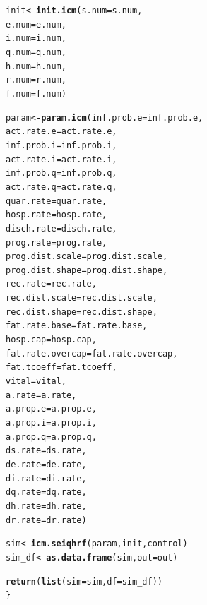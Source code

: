 \documentclass{article}\usepackage[]{graphicx}\usepackage[]{color}
\makeatletter
\newcommand{\hlstd}[1]{\textcolor[rgb]{0.345,0.345,0.345}{#1}}%
\newcommand{\hlkwb}[1]{\textcolor[rgb]{0.69,0.353,0.396}{#1}}%
\newcommand{\hlkwc}[1]{\textcolor[rgb]{0.333,0.667,0.333}{#1}}%
\newcommand{\hlkwd}[1]{\textcolor[rgb]{0.737,0.353,0.396}{\textbf{#1}}}%
\newenvironment{kframe}{%
 \def\at@end@of@kframe{}%
 \ifinner\ifhmode%
  \def\at@end@of@kframe{\end{minipage}}%
  \begin{minipage}{\columnwidth}%
 \fi\fi%
 \def\FrameCommand##1{\hskip\@totalleftmargin \hskip-\fboxsep
 \colorbox{shadecolor}{##1}\hskip-\fboxsep
     \hskip-\linewidth \hskip-\@totalleftmargin \hskip\columnwidth}%
 \MakeFramed {\advance\hsize-\width
   \@totalleftmargin\z@ \linewidth\hsize
   \@setminipage}}%
 {\par\unskip\endMakeFramed%
 \at@end@of@kframe}
\newenvironment{knitrout}{}{} %
\makeatother
\begin{document}
\begin{knitrout}
\begin{kframe}
\begin{alltt}
  \hlstd{init} \hlkwb{<-} \hlkwd{init.icm}\hlstd{(}\hlkwc{s.num} \hlstd{= s.num,}
                   \hlkwc{e.num} \hlstd{= e.num,}
                   \hlkwc{i.num} \hlstd{= i.num,}
                   \hlkwc{q.num} \hlstd{= q.num,}
                   \hlkwc{h.num} \hlstd{= h.num,}
                   \hlkwc{r.num} \hlstd{= r.num,}
                   \hlkwc{f.num} \hlstd{= f.num)}

  \hlstd{param} \hlkwb{<-}  \hlkwd{param.icm}\hlstd{(}\hlkwc{inf.prob.e} \hlstd{= inf.prob.e,}
                      \hlkwc{act.rate.e} \hlstd{= act.rate.e,}
                      \hlkwc{inf.prob.i} \hlstd{= inf.prob.i,}
                      \hlkwc{act.rate.i} \hlstd{= act.rate.i,}
                      \hlkwc{inf.prob.q} \hlstd{= inf.prob.q,}
                      \hlkwc{act.rate.q} \hlstd{= act.rate.q,}
                      \hlkwc{quar.rate} \hlstd{= quar.rate,}
                      \hlkwc{hosp.rate} \hlstd{= hosp.rate,}
                      \hlkwc{disch.rate} \hlstd{= disch.rate,}
                      \hlkwc{prog.rate} \hlstd{= prog.rate,}
                      \hlkwc{prog.dist.scale} \hlstd{= prog.dist.scale,}
                      \hlkwc{prog.dist.shape} \hlstd{= prog.dist.shape,}
                      \hlkwc{rec.rate} \hlstd{= rec.rate,}
                      \hlkwc{rec.dist.scale} \hlstd{= rec.dist.scale,}
                      \hlkwc{rec.dist.shape} \hlstd{= rec.dist.shape,}
                      \hlkwc{fat.rate.base} \hlstd{= fat.rate.base,}
                      \hlkwc{hosp.cap} \hlstd{= hosp.cap,}
                      \hlkwc{fat.rate.overcap} \hlstd{= fat.rate.overcap,}
                      \hlkwc{fat.tcoeff} \hlstd{= fat.tcoeff,}
                      \hlkwc{vital} \hlstd{= vital,}
                      \hlkwc{a.rate} \hlstd{= a.rate,}
                      \hlkwc{a.prop.e} \hlstd{= a.prop.e,}
                      \hlkwc{a.prop.i} \hlstd{= a.prop.i,}
                      \hlkwc{a.prop.q} \hlstd{= a.prop.q,}
                      \hlkwc{ds.rate} \hlstd{= ds.rate,}
                      \hlkwc{de.rate} \hlstd{= de.rate,}
                      \hlkwc{di.rate} \hlstd{= di.rate,}
                      \hlkwc{dq.rate} \hlstd{= dq.rate,}
                      \hlkwc{dh.rate} \hlstd{= dh.rate,}
                      \hlkwc{dr.rate} \hlstd{= dr.rate)}

  \hlstd{sim} \hlkwb{<-} \hlkwd{icm.seiqhrf}\hlstd{(param, init, control)}
  \hlstd{sim_df} \hlkwb{<-} \hlkwd{as.data.frame}\hlstd{(sim,} \hlkwc{out}\hlstd{=out)}

  \hlkwd{return}\hlstd{(}\hlkwd{list}\hlstd{(}\hlkwc{sim}\hlstd{=sim,} \hlkwc{df}\hlstd{=sim_df))}
\hlstd{\}}
\end{alltt}
\end{kframe}
\end{knitrout}
\end{document}
